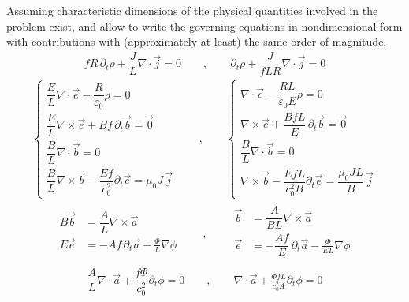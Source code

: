 \documentclass[letterpaper,10pt,english]{jupyterBook}
\begin{document}
\sphinxAtStartPar
Assuming characteristic dimensions of the physical quantities involved in the problem exist, and allow to write the governing equations in non\sphinxhyphen{}dimensional form with contributions with (approximately at least) the same order of magnitude,
\begin{equation*}
\begin{split}
    f R \, \partial_t \rho + \dfrac{J}{L} \nabla \cdot \vec{j} = 0
  \qquad , \qquad
    \partial_t \rho + \dfrac{J}{f L R} \nabla \cdot \vec{j} = 0
  \end{split}
\end{equation*}\begin{equation*}
\begin{split}
  \begin{cases}
    \dfrac{E}{L} \nabla \cdot \vec{e} - \dfrac{R}{\varepsilon_0} \rho = 0 \\
    \dfrac{E}{L} \nabla \times \vec{e} + {B f} \, \partial_t \vec{b} = \vec{0} \\ 
    \dfrac{B}{L} \nabla \cdot \vec{b} = 0 \\
    \dfrac{B}{L} \nabla \times \vec{b} - \dfrac{E f}{c_0^2} \partial_t \vec{e} = \mu_0 J \, \vec{j} 
  \end{cases}
  \qquad , \qquad 
  \begin{cases}
    \nabla \cdot \vec{e} - \dfrac{R L}{\varepsilon_0 E} \rho = 0 \\
    \nabla \times \vec{e} + \dfrac{B f L}{E} \, \partial_t \vec{b} = \vec{0} \\ 
    \dfrac{B}{L} \nabla \cdot \vec{b} = 0 \\
    \nabla \times \vec{b} - \dfrac{E f L}{c_0^2 B} \partial_t \vec{e} = \dfrac{\mu_0 J L}{B} \, \vec{j} 
  \end{cases}
  \end{split}
\end{equation*}\begin{equation*}
\begin{split}
  \begin{aligned}
     B \vec{b} & = \dfrac{A}{L} \nabla \times \vec{a} \\
     E \vec{e} & = - A f \, \partial_t \vec{a} - \frac{\Phi}{L} \nabla \phi \\
  \end{aligned}
  \qquad , \qquad 
  \begin{aligned}
     \vec{b} & = \dfrac{A}{B L} \nabla \times \vec{a} \\
     \vec{e} & = - \dfrac{A f}{E} \, \partial_t \vec{a} - \frac{\Phi}{E L} \nabla \phi \\
  \end{aligned}
  \end{split}
\end{equation*}\begin{equation*}
\begin{split}
    \dfrac{A}{L} \nabla \cdot \vec{a} + \dfrac{f \Phi}{c_0^2} \partial_t \phi = 0
  \qquad , \qquad 
    \nabla \cdot \vec{a} + \frac{\Phi f L}{c_0^2 A} \partial_t \phi = 0
  \end{split}
\end{equation*}
\end{document}
